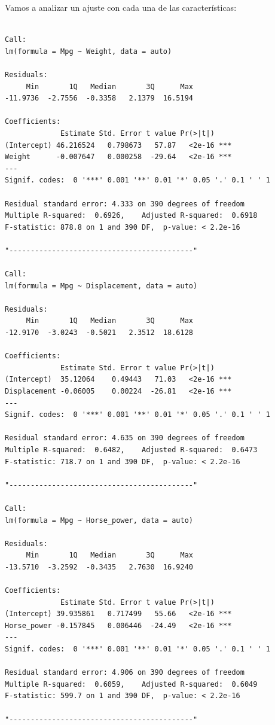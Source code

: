 Vamos a analizar un ajuste con cada una de las características:

\begin{verbatim}

Call:
lm(formula = Mpg ~ Weight, data = auto)

Residuals:
     Min       1Q   Median       3Q      Max 
-11.9736  -2.7556  -0.3358   2.1379  16.5194 

Coefficients:
             Estimate Std. Error t value Pr(>|t|)    
(Intercept) 46.216524   0.798673   57.87   <2e-16 ***
Weight      -0.007647   0.000258  -29.64   <2e-16 ***
---
Signif. codes:  0 '***' 0.001 '**' 0.01 '*' 0.05 '.' 0.1 ' ' 1

Residual standard error: 4.333 on 390 degrees of freedom
Multiple R-squared:  0.6926,    Adjusted R-squared:  0.6918 
F-statistic: 878.8 on 1 and 390 DF,  p-value: < 2.2e-16

"-------------------------------------------"

Call:
lm(formula = Mpg ~ Displacement, data = auto)

Residuals:
     Min       1Q   Median       3Q      Max 
-12.9170  -3.0243  -0.5021   2.3512  18.6128 

Coefficients:
             Estimate Std. Error t value Pr(>|t|)    
(Intercept)  35.12064    0.49443   71.03   <2e-16 ***
Displacement -0.06005    0.00224  -26.81   <2e-16 ***
---
Signif. codes:  0 '***' 0.001 '**' 0.01 '*' 0.05 '.' 0.1 ' ' 1

Residual standard error: 4.635 on 390 degrees of freedom
Multiple R-squared:  0.6482,    Adjusted R-squared:  0.6473 
F-statistic: 718.7 on 1 and 390 DF,  p-value: < 2.2e-16

"-------------------------------------------"

Call:
lm(formula = Mpg ~ Horse_power, data = auto)

Residuals:
     Min       1Q   Median       3Q      Max 
-13.5710  -3.2592  -0.3435   2.7630  16.9240 

Coefficients:
             Estimate Std. Error t value Pr(>|t|)    
(Intercept) 39.935861   0.717499   55.66   <2e-16 ***
Horse_power -0.157845   0.006446  -24.49   <2e-16 ***
---
Signif. codes:  0 '***' 0.001 '**' 0.01 '*' 0.05 '.' 0.1 ' ' 1

Residual standard error: 4.906 on 390 degrees of freedom
Multiple R-squared:  0.6059,    Adjusted R-squared:  0.6049 
F-statistic: 599.7 on 1 and 390 DF,  p-value: < 2.2e-16

"-------------------------------------------"


\end{verbatim}
